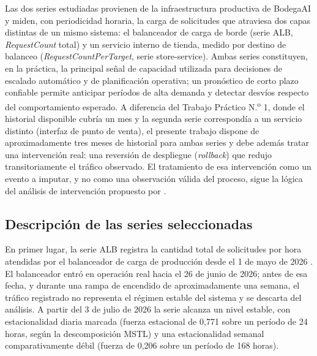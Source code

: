 Las dos series estudiadas provienen de la infraestructura productiva de BodegaAI y miden, con
periodicidad horaria, la carga de solicitudes que atraviesa dos capas distintas de un mismo sistema: el
balanceador de carga de borde (serie ALB, \emph{RequestCount} total) y un servicio interno de tienda,
medido por destino de balanceo (\emph{RequestCountPerTarget}, serie store-service). Ambas series
constituyen, en la práctica, la principal señal de capacidad utilizada para decisiones de escalado
automático y de planificación operativa; un pronóstico de corto plazo confiable permite anticipar
períodos de alta demanda y detectar desvíos respecto del comportamiento esperado. A diferencia del
Trabajo Práctico N.\textsuperscript{o} 1, donde el historial disponible cubría un mes y la segunda serie
correspondía a un servicio distinto (interfaz de punto de venta), el presente trabajo dispone de
aproximadamente tres meses de historial para ambas series y debe además tratar una intervención real:
una reversión de despliegue (\emph{rollback}) que redujo transitoriamente el tráfico observado. El
tratamiento de esa intervención como un evento a imputar, y no como una observación válida del proceso,
sigue la lógica del análisis de intervención propuesto por \textcite{boxtiao1975}.

\subsection{Descripción de las series seleccionadas}

En primer lugar, la serie ALB registra la cantidad total de solicitudes por hora atendidas por el
balanceador de carga de producción desde el 1 de mayo de 2026 \parencite{datos_alb_tpfinal}. El
balanceador entró en operación real hacia el 26 de junio de 2026; antes de esa fecha, y durante una
rampa de encendido de aproximadamente una semana, el tráfico registrado no representa el régimen estable
del sistema y se descarta del análisis. A partir del 3 de julio de 2026 la serie alcanza un nivel estable,
con estacionalidad diaria marcada (fuerza estacional de 0,771 sobre un período de 24 horas, según la
descomposición MSTL) y una estacionalidad semanal comparativamente débil (fuerza de 0,206 sobre un
período de 168 horas).

